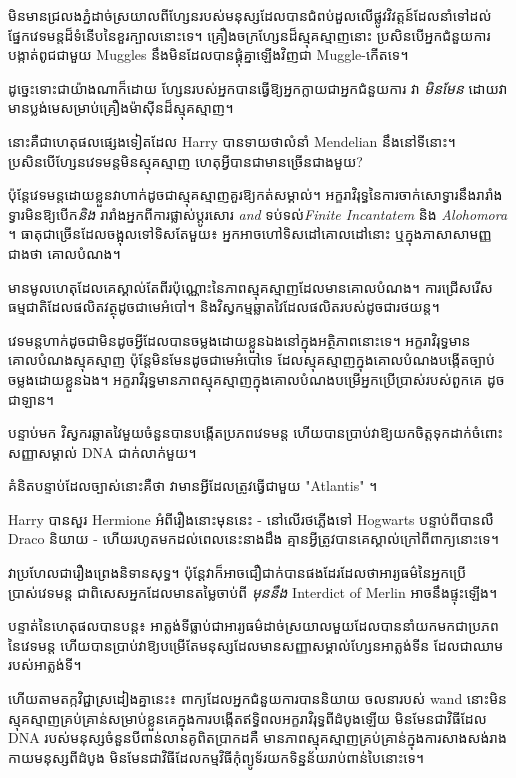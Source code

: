 មិនមានជ្រលងភ្នំដាច់ស្រយាលពីហ្សែនរបស់មនុស្សដែលបានជំពប់ដួលលើផ្លូវវិវត្តន៍ដែលនាំទៅដល់ផ្នែកវេទមន្តដ៏ទំនើបនៃខួរក្បាលនោះទេ។ គ្រឿងចក្រហ្សែនដ៏ស្មុគស្មាញនោះ ប្រសិនបើអ្នកជំនួយការបង្កាត់ពូជជាមួយ Muggles នឹងមិនដែលបានផ្គុំគ្នាឡើងវិញជា Muggle-កើតទេ។

ដូច្នេះទោះជាយ៉ាងណាក៏ដោយ ហ្សែនរបស់អ្នកបានធ្វើឱ្យអ្នកក្លាយជាអ្នកជំនួយការ វា \emph{មិនមែន} ដោយវាមានប្លង់មេសម្រាប់គ្រឿងម៉ាស៊ីនដ៏ស្មុគស្មាញ។

នោះគឺជាហេតុផលផ្សេងទៀតដែល Harry បានទាយថាលំនាំ Mendelian នឹងនៅទីនោះ។ ប្រសិនបើហ្សែនវេទមន្តមិនស្មុគស្មាញ ហេតុអ្វីបានជាមានច្រើនជាងមួយ?

ប៉ុន្តែ​វេទមន្ត​ដោយ​ខ្លួន​វា​ហាក់​ដូច​ជា​ស្មុគស្មាញ​គួរ​ឱ្យ​កត់​សម្គាល់​។ អក្ខរាវិរុទ្ធនៃការចាក់សោទ្វារនឹងរារាំងទ្វារមិនឱ្យបើក\emph{និង} រារាំងអ្នកពីការផ្លាស់ប្តូរសោរ \emph{and} ទប់ទល់\emph{Finite Incantatem} និង \emph{Alohomora} ។ ធាតុជាច្រើនដែលចង្អុលទៅទិសតែមួយ៖ អ្នកអាចហៅទិសដៅគោលដៅនោះ ឬក្នុងភាសាសាមញ្ញជាងថា គោលបំណង។

មានមូលហេតុដែលគេស្គាល់តែពីរប៉ុណ្ណោះនៃភាពស្មុគស្មាញដែលមានគោលបំណង។ ការជ្រើសរើសធម្មជាតិដែលផលិតវត្ថុដូចជាមេអំបៅ។ និងវិស្វកម្មឆ្លាតវៃដែលផលិតរបស់ដូចជារថយន្ត។

វេទមន្តហាក់ដូចជាមិនដូចអ្វីដែលបានចម្លងដោយខ្លួនឯងនៅក្នុងអត្ថិភាពនោះទេ។ អក្ខរាវិរុទ្ធមានគោលបំណងស្មុគស្មាញ ប៉ុន្តែមិនមែនដូចជាមេអំបៅទេ ដែលស្មុគស្មាញក្នុងគោលបំណងបង្កើតច្បាប់ចម្លងដោយខ្លួនឯង។ អក្ខរាវិរុទ្ធមានភាពស្មុគស្មាញក្នុងគោលបំណងបម្រើអ្នកប្រើប្រាស់របស់ពួកគេ ដូចជាឡាន។

បន្ទាប់មក វិស្វករឆ្លាតវៃមួយចំនួនបានបង្កើតប្រភពវេទមន្ត ហើយបានប្រាប់វាឱ្យយកចិត្តទុកដាក់ចំពោះសញ្ញាសម្គាល់ DNA ជាក់លាក់មួយ។

គំនិតបន្ទាប់ដែលច្បាស់នោះគឺថា វាមានអ្វីដែលត្រូវធ្វើជាមួយ "Atlantis" ។

Harry បានសួរ Hermione អំពីរឿងនោះមុននេះ - នៅលើរថភ្លើងទៅ Hogwarts បន្ទាប់ពីបានលឺ Draco និយាយ - ហើយរហូតមកដល់ពេលនេះនាងដឹង គ្មានអ្វីត្រូវបានគេស្គាល់ក្រៅពីពាក្យនោះទេ។

វាប្រហែលជារឿងព្រេងនិទានសុទ្ធ។ ប៉ុន្តែវាក៏អាចជឿជាក់បានផងដែរដែលថាអារ្យធម៌នៃអ្នកប្រើប្រាស់វេទមន្ត ជាពិសេសអ្នកដែលមានតម្លៃចាប់ពី \emph{មុននឹង} Interdict of Merlin អាចនឹងផ្ទុះឡើង។

បន្ទាត់នៃហេតុផលបានបន្ត៖ អាត្លង់ទីធ្លាប់ជាអារ្យធម៌ដាច់ស្រយាលមួយដែលបាននាំយកមកជាប្រភពនៃវេទមន្ត ហើយបានប្រាប់វាឱ្យបម្រើតែមនុស្សដែលមានសញ្ញាសម្គាល់ហ្សែនអាត្លង់ទីន ដែលជាឈាមរបស់អាត្លង់ទី។

ហើយតាមតក្កវិជ្ជាស្រដៀងគ្នានេះ៖ ពាក្យដែលអ្នកជំនួយការបាននិយាយ ចលនារបស់ wand នោះមិនស្មុគស្មាញគ្រប់គ្រាន់សម្រាប់ខ្លួនគេក្នុងការបង្កើតឥទ្ធិពលអក្ខរាវិរុទ្ធពីដំបូងឡើយ មិនមែនជាវិធីដែល DNA របស់មនុស្សចំនួនបីពាន់លានគូពិតប្រាកដគឺ\emph{ } មានភាពស្មុគស្មាញគ្រប់គ្រាន់ក្នុងការសាងសង់រាងកាយមនុស្សពីដំបូង មិនមែនជាវិធីដែលកម្មវិធីកុំព្យូទ័រយកទិន្នន័យរាប់ពាន់បៃនោះទេ។

